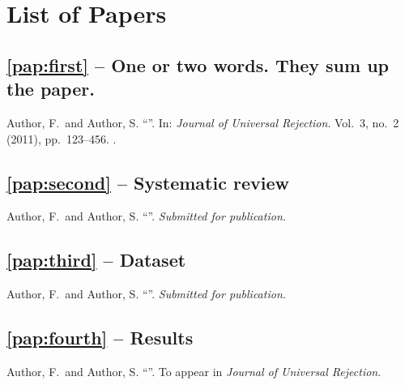 \chapter{List of Papers}

\section*{\cref{pap:first} -- One or two words. They sum up the paper.}
Author, F.\ and Author, S.
\enquote{}.
In: \emph{Journal of Universal Rejection}.
Vol.\ 3,
no.\ 2
(2011),
pp.~123--456.
.

\section*{\cref{pap:second} -- Systematic review}
Author, F.\ and Author, S.
\enquote{}.
\emph{Submitted for publication.}

\section*{\cref{pap:third} -- Dataset}
Author, F.\ and Author, S.
\enquote{}.
\emph{Submitted for publication.}

\section*{\cref{pap:fourth} -- Results}
Author, F.\ and Author, S.
\enquote{}.
To appear in \emph{Journal of Universal Rejection}.
